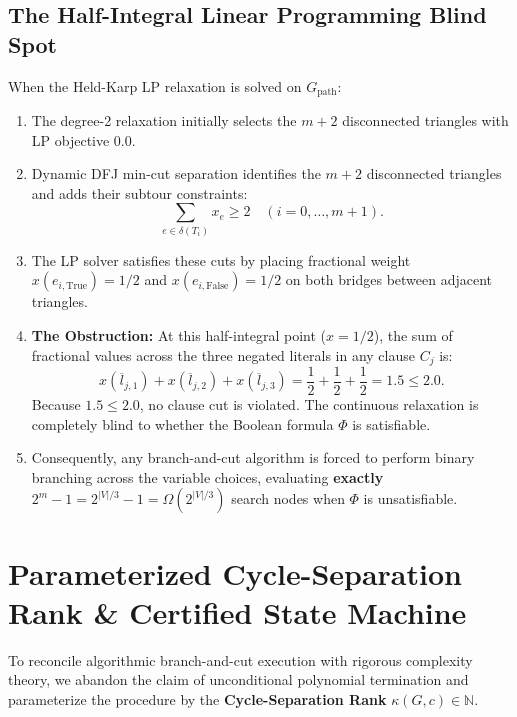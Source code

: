 \documentclass[11pt,a4paper]{article}
\renewcommand{\_}{\origunderscore\allowbreak}
\theoremstyle{plain}
\theoremstyle{definition}
\theoremstyle{remark}
\begin{document}
\subsection{The Half-Integral Linear Programming Blind Spot}
When the Held-Karp LP relaxation is solved on $G_{\text{path}}$:
\begin{enumerate}
  \item The degree-2 relaxation initially selects the $m + 2$ disconnected triangles with LP objective $0.0$.
  \item Dynamic DFJ min-cut separation identifies the $m + 2$ disconnected triangles and adds their subtour constraints:
  \begin{equation}
    \sum_{e \in \delta(T_i)} x_e \ge 2 \quad (i = 0, \dots, m+1).
  \end{equation}
  \item The LP solver satisfies these cuts by placing fractional weight $x(e_{i, \text{True}}) = 1/2$ and $x(e_{i, \text{False}}) = 1/2$ on both bridges between adjacent triangles.
  \item \textbf{The Obstruction:} At this half-integral point ($x = 1/2$), the sum of fractional values across the three negated literals in any clause $C_j$ is:
  \begin{equation}
    x(\overline{l}_{j, 1}) + x(\overline{l}_{j, 2}) + x(\overline{l}_{j, 3}) = \frac{1}{2} + \frac{1}{2} + \frac{1}{2} = 1.5 \le 2.0.
  \end{equation}
  Because $1.5 \le 2.0$, no clause cut is violated. The continuous relaxation is completely blind to whether the Boolean formula $\Phi$ is satisfiable.
  \item Consequently, any branch-and-cut algorithm is forced to perform binary branching across the variable choices, evaluating \textbf{exactly $2^m - 1 = 2^{|V|/3} - 1 = \Omega(2^{|V|/3})$} search nodes when $\Phi$ is unsatisfiable.
\end{enumerate}

\section{Parameterized Cycle-Separation Rank \& Certified State Machine}

To reconcile algorithmic branch-and-cut execution with rigorous complexity theory, we abandon the claim of unconditional polynomial termination and parameterize the procedure by the \textbf{Cycle-Separation Rank} $\kappa(G, c) \in \mathbb{N}$.
\end{document}
